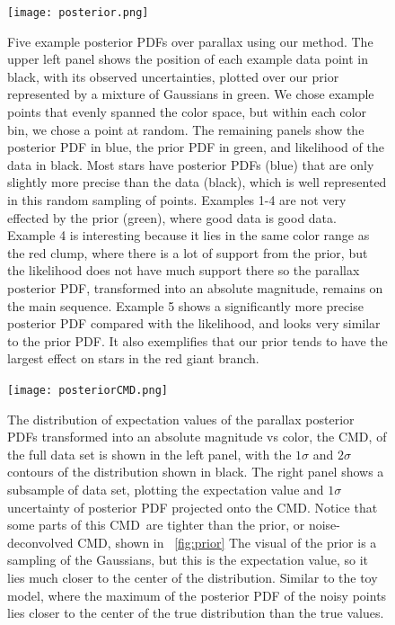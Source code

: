 \documentclass[modern]{aastex61}
\newcommand{\acronym}[1]{{\small{#1}}}
\newcommand{\cmd}{\acronym{CMD}}
\begin{document}
\begin{figure}
\centering
  \texttt{[image: posterior.png]}
\caption{Five example posterior PDFs over parallax using our method.
The upper left panel shows the position of each example data point in black, with its observed uncertainties, plotted over our prior represented by a mixture of Gaussians in green.
We chose example points that evenly spanned the color space, but within each color bin, we chose a point at random.
The remaining panels show the posterior PDF in blue, the prior PDF in green, and likelihood of the data in black.
Most stars have posterior PDFs (blue) that are only slightly more precise than the data (black), which is well represented in this random sampling of points.
Examples 1-4 are not very effected by the prior (green), where good data is good data.
Example 4 is interesting because it lies in the same color range as the red clump, where there is a lot of support from the prior, but the likelihood does not have much support there so the parallax posterior PDF, transformed into an absolute magnitude, remains on the main sequence.
Example 5 shows a significantly more precise posterior PDF compared with the likelihood, and looks very similar to the prior PDF.
It also exemplifies that our prior tends to have the largest effect on stars in the red giant branch.}
\label{fig:posterior}
\end{figure}

\begin{figure}
\centering
  \texttt{[image: posteriorCMD.png]}
\caption{The distribution of expectation values of the parallax posterior PDFs transformed into an absolute magnitude vs color, the \cmd, of the full data set is shown in the left panel, with the $1\sigma$ and $2\sigma$ contours of the distribution shown in black.
The right panel shows a subsample of data set, plotting the expectation value and $1\sigma$ uncertainty of posterior PDF projected onto the \cmd.
Notice that some parts of this \cmd\ are tighter than the prior, or noise-deconvolved \cmd, shown in \figurename~\ref{fig:prior}
The visual of the prior is a sampling of the Gaussians, but this is the expectation
  value, so it lies much closer to the center of the
  distribution. Similar to the toy model, where the maximum of the
  posterior PDF of the noisy points lies closer to the center of the true distribution than the true values.}
\label{fig:posteriorCMD}
\end{figure}
\end{document}
